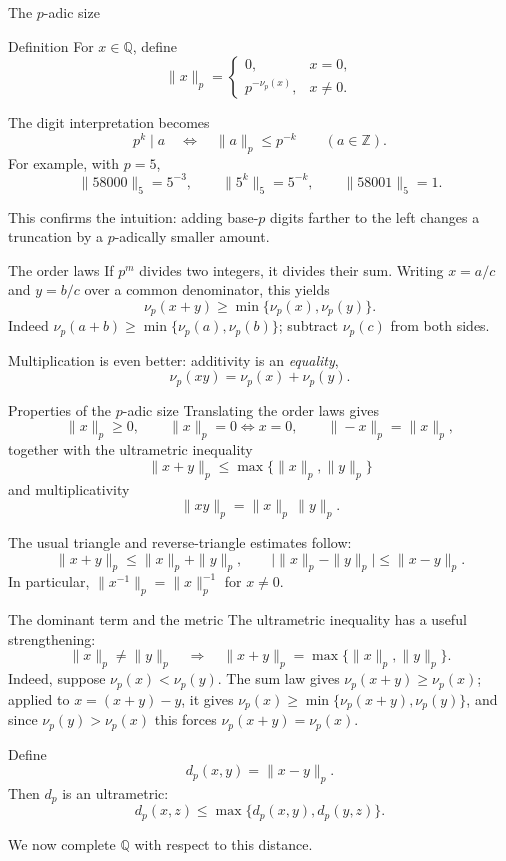 \documentclass[aspectratio=169,11pt]{beamer}
\newcommand{\Z}{\mathbb Z}
\newcommand{\Q}{\mathbb Q}
\begin{document}
\begin{frame}{The \(p\)-adic size}
  \begin{block}{Definition}
    For \(x\in\Q\), define
    \[
      \boxed{
      \|x\|_p=
      \begin{cases}
        0,&x=0,\\
        p^{-\nu_p(x)},&x\ne0.
      \end{cases}}
    \]
  \end{block}

  The digit interpretation becomes
  \[
    p^k\mid a
    \quad\Longleftrightarrow\quad
    \|a\|_p\le p^{-k}
    \qquad(a\in\Z).
  \]
  For example, with \(p=5\),
  \[
    \|58000\|_5=5^{-3},
    \qquad
    \|5^k\|_5=5^{-k},
    \qquad
    \|58001\|_5=1.
  \]

  This confirms the intuition: adding base-\(p\) digits farther to the
  left changes a truncation by a \(p\)-adically smaller amount.
\end{frame}

\begin{frame}{The order laws}
  If \(p^m\) divides two integers, it divides their sum.  Writing
  \(x=a/c\) and \(y=b/c\) over a common denominator, this yields
  \[
    \boxed{\nu_p(x+y)\ge\min\{\nu_p(x),\nu_p(y)\}.}
  \]
  Indeed \(\nu_p(a+b)\ge\min\{\nu_p(a),\nu_p(b)\}\); subtract
  \(\nu_p(c)\) from both sides.

  Multiplication is even better: additivity is an \emph{equality},
  \[
    \boxed{\nu_p(xy)=\nu_p(x)+\nu_p(y).}
  \]
\end{frame}

\begin{frame}{Properties of the \(p\)-adic size}
  Translating the order laws gives
  \[
    \|x\|_p\ge0,
    \qquad
    \|x\|_p=0\Longleftrightarrow x=0,
    \qquad
    \|-x\|_p=\|x\|_p,
  \]
  together with the ultrametric inequality
  \[
    \boxed{\|x+y\|_p
      \le\max\{\|x\|_p,\|y\|_p\}}
  \]
  and multiplicativity
  \[
    \boxed{\|xy\|_p=\|x\|_p\,\|y\|_p.}
  \]

  The usual triangle and reverse-triangle estimates follow:
  \[
    \|x+y\|_p\le\|x\|_p+\|y\|_p,
    \qquad
    \bigl|\|x\|_p-\|y\|_p\bigr|\le\|x-y\|_p.
  \]
  In particular, \(\|x^{-1}\|_p=\|x\|_p^{-1}\) for \(x\ne0\).
\end{frame}

\begin{frame}{The dominant term and the metric}
  The ultrametric inequality has a useful strengthening:
  \[
    \|x\|_p\ne\|y\|_p
    \quad\Longrightarrow\quad
    \boxed{\|x+y\|_p=\max\{\|x\|_p,\|y\|_p\}.}
  \]
  Indeed, suppose \(\nu_p(x)<\nu_p(y)\).  The sum law gives
  \(\nu_p(x+y)\ge\nu_p(x)\); applied to \(x=(x+y)-y\), it gives
  \(\nu_p(x)\ge\min\{\nu_p(x+y),\nu_p(y)\}\), and since
  \(\nu_p(y)>\nu_p(x)\) this forces \(\nu_p(x+y)=\nu_p(x)\).

  Define
  \[
    d_p(x,y)=\|x-y\|_p.
  \]
  Then \(d_p\) is an ultrametric:
  \[
    d_p(x,z)\le\max\{d_p(x,y),d_p(y,z)\}.
  \]

  We now complete \(\Q\) with respect to this distance.
\end{frame}
\end{document}
